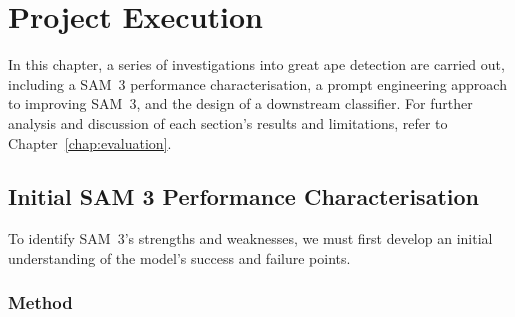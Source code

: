 \documentclass[author={Jacob Stephenson},
    degree={BSc},
    title={Robust Great Ape Species Detection in Wild Camera Trap Imagery with Promptable Concept Segmentation},
    unit={COMS30045},
    subtitle={}]{dissertation}
\begin{document}

\chapter{Project Execution}
\label{chap:execution}

In this chapter, a series of investigations into great ape detection are carried out, including a SAM~3 performance characterisation, a prompt engineering approach to improving SAM~3, and the design of a downstream classifier. For further analysis and discussion of each section's results and limitations, refer to Chapter~\ref{chap:evaluation}.

\section{Initial SAM 3 Performance Characterisation}
\label{sec:execution_initial}

To identify SAM~3's strengths and weaknesses, we must first develop an initial understanding of the model's success and failure points.

\subsection{Method}

\end{document}
